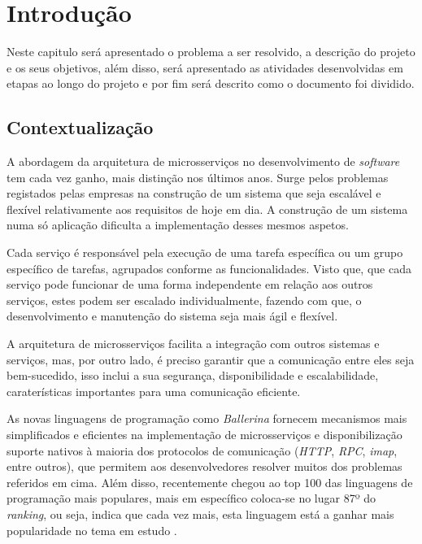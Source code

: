 
\chapter{Introdução} 	%
\label{Chapter1} 		%


Neste capitulo será apresentado o problema a ser resolvido, a descrição do projeto e os seus objetivos, além disso, será apresentado as atividades desenvolvidas em etapas ao longo do projeto e por fim será descrito como o documento foi dividido.
	


\section{Contextualização}
\label{sec:Ch1.1}

A abordagem da arquitetura de microsserviços no desenvolvimento de \textit{software} tem cada vez ganho, mais distinção nos últimos anos. Surge pelos problemas registados pelas empresas na construção de um sistema que seja escalável e flexível relativamente aos requisitos de hoje em dia. A construção de um sistema numa só aplicação dificulta a implementação desses mesmos aspetos.

Cada serviço é responsável pela execução de uma tarefa específica ou um grupo específico de tarefas, agrupados conforme as funcionalidades. Visto que, que cada serviço pode funcionar de uma forma independente em relação aos outros serviços, estes podem ser escalado individualmente, fazendo com que, o desenvolvimento e manutenção do sistema seja mais ágil e flexível.

A arquitetura de microsserviços facilita a integração com outros sistemas e serviços, mas, por outro lado,
é preciso garantir que a comunicação entre eles seja bem-sucedido, isso inclui a sua segurança, disponibilidade e escalabilidade, caraterísticas importantes para uma comunicação eficiente.

As novas linguagens de programação como \textit{Ballerina} fornecem mecanismos mais simplificados e eficientes na implementação de microsserviços e disponibilização suporte nativos à maioria dos protocolos de comunicação (\textit{HTTP}, \textit{RPC}, \textit{\ac{imap}}, entre outros), que permitem aos desenvolvedores resolver muitos dos problemas referidos em cima. Além disso, recentemente chegou ao top 100 das linguagens de programação mais populares, mais em específico coloca-se no lugar 87º do \textit{ranking}, ou seja, indica que cada vez mais, esta linguagem está a ganhar mais popularidade no tema em estudo \cite{top100}. 

